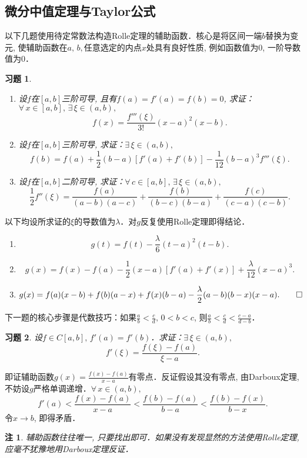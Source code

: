\documentclass[11pt,a4paper]{ctexart}
\makeatletter
\theoremstyle{thmseries} %
\theoremstyle{exerseries}
\newtheorem{exer}{习题}[section]
\newtheorem*{rem}{注}
\renewenvironment{proof}[1][\proofname]{\par
  \pushQED{\qed}%
  \normalfont \topsep6\p@\@plus6\p@\relax
  \trivlist
  \item[\hskip\labelsep
        \itshape
    #1\@addpunct{}]\ignorespaces
}{%
  \popQED\endtrivlist\@endpefalse
}
\newenvironment{pf}{\begin{proof}[\bfseries\upshape 证\quad]}{\end{proof}}
\newcommand{\sbra}[1]{\mathopen{}\left[#1\right]}
\makeatother
\begin{document}
\subsection{微分中值定理与Taylor公式}
以下几题使用待定常数法构造Rolle定理的辅助函数．核心是将区间一端$b$替换为变元, 使辅助函数在$a,\,b,$任意选定的内点$x$处具有良好性质, 例如函数值为0, 一阶导数值为0．
\begin{exer}
	\phantom{linebreak}
	\begin{enumerate}
		\item 设$f$在$[a,b]$三阶可导, 且有$f(a)=f'(a)=f(b)=0$, 求证：$\forall\,x\in[a,b],\,\exists\,\xi\in(a,b),$
		\[f(x)=\frac{f'''(\xi)}{3!}(x-a)^2(x-b).\]
		\item 设$f$在$[a,b]$三阶可导, 求证：$\exists\,\xi\in(a,b),$
		\[f(b)=f(a)+\frac{1}{2}(b-a)[f'(a)+f'(b)]-\frac{1}{12}(b-a)^3f'''(\xi).\]
		\item 设$f$在$[a,b]$二阶可导, 求证：$\forall\,c\in[a,b],\,\exists\,\xi\in(a,b),$
		\[\frac{1}{2}f''(\xi)=\frac{f(a)}{(a-b)(a-c)}+\frac{f(b)}{(b-c)(b-a)}+\frac{f(c)}{(c-a)(c-b)}.\]
	\end{enumerate}
\end{exer}
\begin{pf}
	以下均设所求证的$\xi$的导数值为$\lambda$．对$g$反复使用Rolle定理即得结论．
	\begin{enumerate}
		\item \[g(t)=f(t)-\frac{\lambda}{6}(t-a)^2(t-b).\]
		\item \[g(x)=f(x)-f(a)-\frac{1}{2}(x-a)\sbra{f'(a)+f'(x)}+\frac{\lambda}{12}(x-a)^3.\]
		\item \[g(x)=f(a)(x-b)+f(b)(a-x)+f(x)(b-a)-\frac{\lambda}{2}(a-b)(b-x)(x-a).\qedhere\]
	\end{enumerate}
\end{pf}

下一题的核心步骤是代数技巧：如果$\frac{a}{b}<\frac{c}{d},\,0<b<c$, 则$\frac{a}{b}<\frac{c}{d}<\frac{c-a}{d-b}$．
\begin{exer}
	设$f\in C[a,b],\,f'(a)=f'(b)$．求证：$\exists\,\xi\in(a,b),$
	\[f'(\xi)=\frac{f(\xi)-f(a)}{\xi-a}.\]
\end{exer}
\begin{pf}
	即证辅助函数$g(x)=\frac{f(x)-f(a)}{x-a}$有零点．反证假设其没有零点, 由Darboux定理, 不妨设$g$严格单调递增．$\forall\,x\in(a,b),$
	\[f'(a)<\frac{f(x)-f(a)}{x-a}<\frac{f(b)-f(a)}{b-a}<\frac{f(b)-f(x)}{b-x}.\]
	令$x\to b$, 即得矛盾．
\end{pf}
\begin{rem}
	辅助函数往往唯一, 只要找出即可．如果没有发现显然的方法使用Rolle定理, 应毫不犹豫地用Darboux定理反证．
\end{rem}
\end{document}
